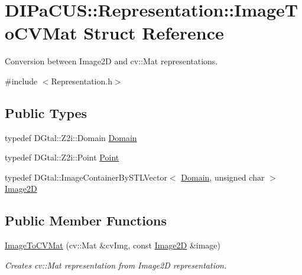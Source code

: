 \hypertarget{structDIPaCUS_1_1Representation_1_1ImageToCVMat}{}\section{D\+I\+Pa\+C\+US\+:\+:Representation\+:\+:Image\+To\+C\+V\+Mat Struct Reference}
\label{structDIPaCUS_1_1Representation_1_1ImageToCVMat}


Conversion between Image2D and cv\+::\+Mat representations.  




{\ttfamily \#include $<$Representation.\+h$>$}

\subsection*{Public Types}
\begin{DoxyCompactItemize}
\item 
typedef D\+Gtal\+::\+Z2i\+::\+Domain \mbox{\hyperlink{structDIPaCUS_1_1Representation_1_1ImageToCVMat_ab2ddd8fb775a4962089398b3fbbea75c}{Domain}}
\item 
typedef D\+Gtal\+::\+Z2i\+::\+Point \mbox{\hyperlink{structDIPaCUS_1_1Representation_1_1ImageToCVMat_a9add92562bf46f1f3bb8e944bf00e775}{Point}}
\item 
typedef D\+Gtal\+::\+Image\+Container\+By\+S\+T\+L\+Vector$<$ \mbox{\hyperlink{structDIPaCUS_1_1Representation_1_1ImageToCVMat_ab2ddd8fb775a4962089398b3fbbea75c}{Domain}}, unsigned char $>$ \mbox{\hyperlink{structDIPaCUS_1_1Representation_1_1ImageToCVMat_acca980e3cfd7e8980cf058d1e8cfb169}{Image2D}}
\end{DoxyCompactItemize}
\subsection*{Public Member Functions}
\begin{DoxyCompactItemize}
\item 
\mbox{\hyperlink{structDIPaCUS_1_1Representation_1_1ImageToCVMat_a603fcae59baae238ba419d83367be61a}{Image\+To\+C\+V\+Mat}} (cv\+::\+Mat \&cv\+Img, const \mbox{\hyperlink{structDIPaCUS_1_1Representation_1_1ImageToCVMat_acca980e3cfd7e8980cf058d1e8cfb169}{Image2D}} \&image)
\begin{DoxyCompactList}\small\item\em Creates cv\+::\+Mat representation from Image2D representation. \end{DoxyCompactList}\end{DoxyCompactItemize}


